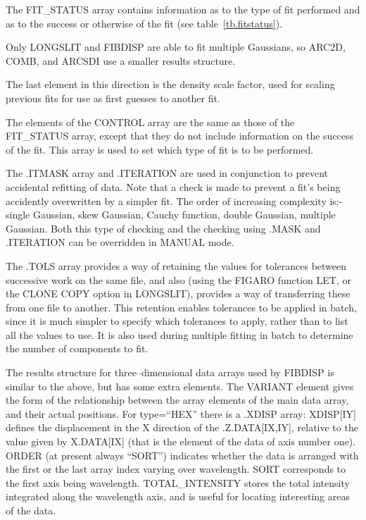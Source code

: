 The FIT\_STATUS array contains information as to the type of fit
performed and as to the success or otherwise of the fit (see
table~\ref{tb.fitstatus}).

Only LONGSLIT and FIBDISP are able to fit multiple Gaussians, so ARC2D,
COMB, and ARCSDI use a smaller results structure.

The last element in this direction is the density scale factor, used for
scaling previous fits for use as first guesses to another fit.

The elements of the CONTROL array are the same as those of the
FIT\_STATUS array, except that they do not include information on the
success of the fit.
This array is used to set which type of fit is to be performed.

The .ITMASK array and .ITERATION are used in conjunction to prevent
accidental refitting of data.
Note that a check is made to prevent a fit's being accidently
overwritten by a simpler fit.
The order of increasing complexity is:- single Gaussian, skew
Gaussian, Cauchy function, double Gaussian, multiple Gaussian.
Both this type of checking and the checking using .MASK and .ITERATION
can be overridden in MANUAL mode.

The .TOLS array provides a way of retaining the values for tolerances
between successive work on the same file, and also (using the FIGARO
function LET, or the CLONE COPY option in LONGSLIT), provides a way of
transferring these from one file to another.
This retention enables tolerances to be applied in batch, since it is
much simpler to specify which tolerances to apply, rather than to list
all the values to use.
It is also used during multiple fitting in batch to determine the number
of components to fit.

The results structure for three--dimensional data arrays used by FIBDISP
is similar to the above, but has some extra elements.
The VARIANT element gives the form of the relationship between the array
elements of the main data array, and their actual positions.
For type=``HEX'' there is a .XDISP array: XDISP[IY] defines the
displacement in the X direction of the .Z.DATA[IX,IY], relative to the
value given by X.DATA[IX] (that is the element of the data of axis
number one).
ORDER (at present always ``SORT'') indicates whether the data is
arranged with the first or the last array index varying over wavelength.
SORT corresponds to the first axis being wavelength.
TOTAL\_INTENSITY stores the total intensity integrated along the
wavelength axis, and is useful for locating interesting areas of the
data.


